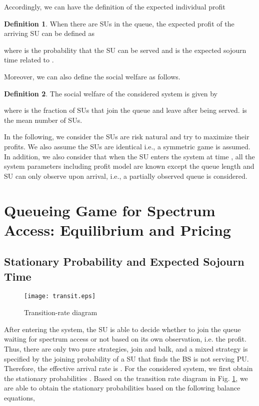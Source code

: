 \documentclass[journal]{IEEEtran}
\begin{document}
\noindent Accordingly, we can have the definition of the expected individual
profit

\theoremstyle{definition}
\newtheorem{definition}{Definition}
\begin{definition} When there are  SUs in the queue, the expected profit of the arriving SU can be defined as

\noindent where  is the probability that the SU can be
served and  is the expected sojourn time related to .
\end{definition}

\noindent Moreover, we can also define the social welfare as follows.

\begin{definition}
The social welfare of the considered system is given by

\noindent where  is the fraction of SUs that join the
queue and leave after being served.  is the mean number of
SUs.
\end{definition}

In the following, we consider the SUs are risk natural and try to
maximize their profits. We also assume the SUs are identical i.e.,
a symmetric game is assumed. In addition, we also consider that
when the SU enters the system at time , all the system
parameters including profit model are known except the queue
length  and SU can only observe  upon arrival, i.e., a
partially observed queue is considered.

\section{Queueing Game for Spectrum Access: Equilibrium and Pricing}

\subsection{Stationary Probability and Expected Sojourn Time}

\begin{figure}[t]
\centering
\texttt{[image: transit.eps]}
\caption{Transition-rate diagram} \label{fig:2}
\end{figure}

After entering the system, the SU is able to decide whether to
join the queue waiting for spectrum access or not based on its own
observation, i.e. the profit. Thus, there are only two pure
strategies, join and balk, and a mixed strategy is specified by
the joining probability  of a SU that finds the BS is
not serving PU. Therefore, the effective arrival rate is
. For the considered system, we first
obtain the stationary probabilities . Based on the
transition rate diagram in Fig. \ref{fig:2}, we are able to obtain
the stationary probabilities  based on the
following balance equations,
\end{document}
